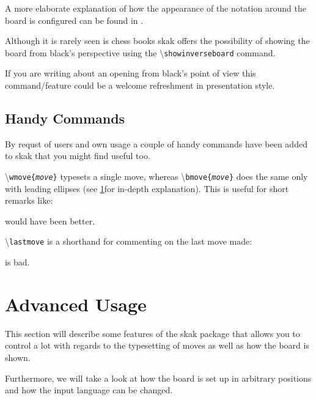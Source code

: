 \documentclass[10pt]{article}
\makeatletter
\renewcommand\showboard{\print@board}
\let\ORIshowboard\showboard
\renewcommand\showboard{%
    \makebox[8\squarelength]{%
    \rule{0pt}{9\squarelength}%
    \begin{postscript}%
    [trim = \squarelength{} 0pt \squarelength{} 0pt]
    \ORIshowboard
    \end{postscript}}}
\newcommand{\package}[1]{\textsf{#1}}
\newcommand{\command}[1]{\textbackslash\texttt{#1}}
\makeatother
\begin{document}
A more elaborate explanation of how the appearance of the notation
around the board is configured can be found in \cite{chessnfss}.

Although it is rarely seen is chess books \package{skak} offers
the possibility of showing the board from black's perspective
using the
\command{showinverseboard} command.

\begin{LTXexample}
\newgame
\showboard

\end{LTXexample}

If you are writing about an opening from black's point of view this
command/feature could be a welcome refreshment in presentation style.


\subsection{Handy Commands}
\label{sec:handycommands}

By requst of users and own usage a couple of handy commands have been
added to \package{skak} that you might find useful too.

\command{wmove\{\emph{move}\}} typesets a single move, whereas
\command{bmove\{\emph{move}\}} does the same only with leading
ellipses (see \ref{sec:advanced-usage}for in-depth explanation). This
is useful for short remarks like:

\begin{LTXexample}
 would have been better.
\end{LTXexample}


\command{lastmove} is a shorthand for commenting on the last move made:

\begin{LTXexample}
\newgame
{}

\lastmove{} is bad.
\end{LTXexample}

\section{Advanced Usage}
\label{sec:advanced-usage}

This section will describe some features of the \package{skak} package
that allows you to control a lot with regards to the typesetting of
moves as well as how the board is shown.

Furthermore, we will take a look at how the board is set up in
arbitrary positions and how the input language can be changed.
\end{document}
